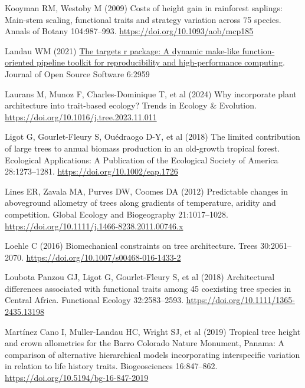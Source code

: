 \documentclass[
  12pt,
  letterpaper,
  DIV=11,
  numbers=noendperiod]{scrartcl}
\newlength{\cslhangindent}
\newenvironment{CSLReferences}[2] %
 {\begin{list}{}{%
  \setlength{\itemindent}{0pt}
  \setlength{\leftmargin}{0pt}
  \setlength{\parsep}{0pt}
  \ifodd #1
   \setlength{\leftmargin}{\cslhangindent}
   \setlength{\itemindent}{-1\cslhangindent}
  \fi
  \setlength{\itemsep}{#2\baselineskip}}}
 {\end{list}}
\begin{document}
\begin{CSLReferences}{1}{1}
Kooyman RM, Westoby M (2009) Costs of height gain in rainforest
saplings: Main-stem scaling, functional traits and strategy variation
across 75 species. Annals of Botany 104:987--993.
\url{https://doi.org/10.1093/aob/mcp185}

Landau WM (2021) \href{https://doi.org/10.21105/joss.02959}{The targets
r package: A dynamic make-like function-oriented pipeline toolkit for
reproducibility and high-performance computing}. Journal of Open Source
Software 6:2959

Laurans M, Munoz F, Charles-Dominique T, et al (2024) Why incorporate
plant architecture into trait-based ecology? Trends in Ecology \&
Evolution. \url{https://doi.org/10.1016/j.tree.2023.11.011}

Ligot G, Gourlet-Fleury S, Ouédraogo D-Y, et al (2018) The limited
contribution of large trees to annual biomass production in an
old-growth tropical forest. Ecological Applications: A Publication of
the Ecological Society of America 28:1273--1281.
\url{https://doi.org/10.1002/eap.1726}

Lines ER, Zavala MA, Purves DW, Coomes DA (2012) Predictable changes in
aboveground allometry of trees along gradients of temperature, aridity
and competition. Global Ecology and Biogeography 21:1017--1028.
\url{https://doi.org/10.1111/j.1466-8238.2011.00746.x}

Loehle C (2016) Biomechanical constraints on tree architecture. Trees
30:2061--2070. \url{https://doi.org/10.1007/s00468-016-1433-2}

Loubota Panzou GJ, Ligot G, Gourlet-Fleury S, et al (2018) Architectural
differences associated with functional traits among 45 coexisting tree
species in {Central} {Africa}. Functional Ecology 32:2583--2593.
\url{https://doi.org/10.1111/1365-2435.13198}

Martínez Cano I, Muller-Landau HC, Wright SJ, et al (2019) Tropical tree
height and crown allometries for the {Barro} {Colorado} {Nature}
{Monument}, {Panama}: A comparison of alternative hierarchical models
incorporating interspecific variation in relation to life history
traits. Biogeosciences 16:847--862.
\url{https://doi.org/10.5194/bg-16-847-2019}


\end{CSLReferences}
\end{document}
